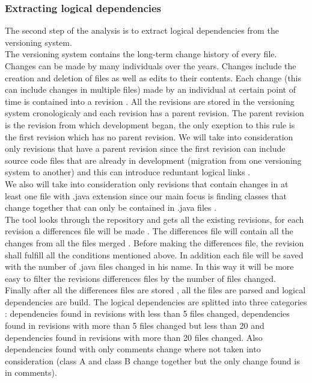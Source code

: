 \documentclass[conference,compsoc]{IEEEtran}
\begin{document}
\subsubsection{ Extracting logical dependencies }
The second step of the analysis is to extract logical dependencies from the versioning system.\\The versioning system contains the long-term change history of every file. Changes can be made by many individuals over the years. Changes include the creation and deletion of files as well as edits to their contents. Each change (this can include changes in multiple files) made by an individual at certain point of time is contained into a revision  \cite{ct7}. All the revisions are stored in the versioning system cronologicaly and each revision has a parent revision. The parent revision is the revision from which development began, the only exeption to this rule is the first revision which has no parent revision. We will take into consideration only revisions that have a parent revision since the first revision can include source code files that are already in development (migration from one versioning system to another) and this can introduce reduntant logical links .\\ We also will take into consideration only revisions that contain changes in at least one file with .java extension since our main focus is finding classes that change together that can only be contained in .java files \cite{ct8} .\\ The tool looks through the repository and gets all the existing revisions, for each revision a differences file will be made . The differences file will contain all the changes from all the files merged . Before making the differences file, the revision shall fulfill all the conditions mentioned above. In addition each file will be saved with the number of .java files changed in his name. In this way it will be more easy to filter the revisions differences files by the number of files changed.\\ Finally after all the differences files are stored , all the files are parsed and logical dependencies are build. The logical dependencies are splitted into three categories : dependencies found in revisions with less than 5 files changed, dependencies found in revisions with more than 5 files changed but less than 20 and dependencies found in revisions with more than 20 files changed. Also dependencies found with only comments change where not taken into consideration (class A and class B change together but the only change found is in comments).
\end{document}

